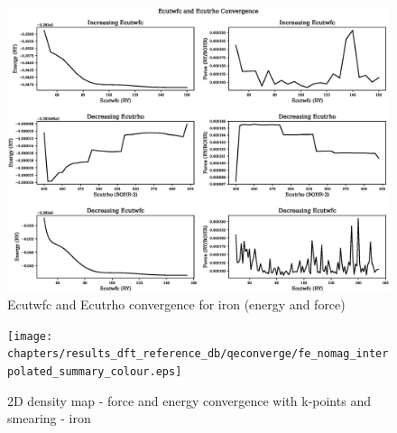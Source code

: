 \begin{landscape}
\FloatBarrier
\begin{figure}
    \begin{center}
        \includegraphics[scale=0.70]{chapters/results_dft_reference_db/qeconverge/fe_nomag_ecut_convergence_ry.eps}
        \caption{Ecutwfc and Ecutrho convergence for iron (energy and force)}
      \label{image:ironecut}
    \end{center}
\end{figure}
\FloatBarrier
\end{landscape}

\clearpage

\begin{landscape}
\FloatBarrier
\begin{figure}
    \begin{center}
        \texttt{[image: chapters/results\_dft\_reference\_db/qeconverge/fe\_nomag\_interpolated\_summary\_colour.eps]}
        \caption{2D density map - force and energy convergence with k-points and smearing - iron}
      \label{image:ironkpointsmearing}
    \end{center}
\end{figure}
\FloatBarrier
\end{landscape}

\clearpage

